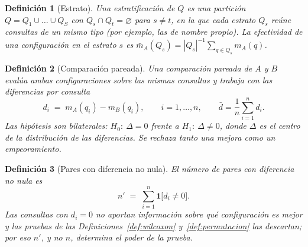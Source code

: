 \documentclass[11pt,letterpaper]{article}
\newtheorem{definition}{Definición}[section]
\numberwithin{equation}{section}
\begin{document}
\begin{definition}[Estrato]
\label{def:estrato}
Una estratificación de $Q$ es una partición $Q=Q_1\cup\dots\cup Q_S$ con $Q_s\cap Q_t=\varnothing$ para $s\neq t$, en la que cada estrato $Q_s$ reúne consultas de un mismo tipo (por ejemplo, las de nombre propio). La efectividad de una configuración en el estrato $s$ es $\bar m_A(Q_s)=|Q_s|^{-1}\sum_{q\in Q_s} m_A(q)$.
\end{definition}

\begin{definition}[Comparación pareada]
\label{def:pareada}
Una comparación pareada de $A$ y $B$ evalúa ambas configuraciones sobre las mismas consultas y trabaja con las diferencias por consulta
\begin{equation}
d_i \;=\; m_A(q_i)-m_B(q_i), \qquad i=1,\dots,n, \qquad \bar d=\frac{1}{n}\sum_{i=1}^{n} d_i .
\label{eq:diferencias}
\end{equation}
Las hipótesis son bilaterales: $H_0\!:\ \Delta=0$ frente a $H_1\!:\ \Delta\neq 0$, donde $\Delta$ es el centro de la distribución de las diferencias. Se rechaza tanto una mejora como un empeoramiento.
\end{definition}

\begin{definition}[Pares con diferencia no nula]
\label{def:no-nulos}
El número de pares con diferencia no nula es
\begin{equation}
n' \;=\; \sum_{i=1}^{n}\mathbf{1}\big[d_i\neq 0\big] .
\label{eq:no-nulos}
\end{equation}
Las consultas con $d_i=0$ no aportan información sobre qué configuración es mejor y las pruebas de las Definiciones~\ref{def:wilcoxon} y~\ref{def:permutacion} las descartan; por eso $n'$, y no $n$, determina el poder de la prueba.
\end{definition}
\end{document}

